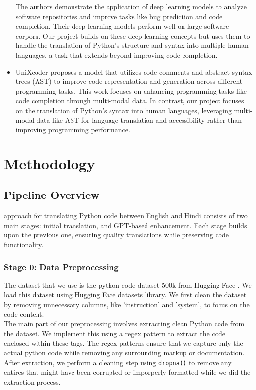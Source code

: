 \documentclass[11pt,a4paper]{article}
\begin{document}
\begin{itemize}
  The authors demonstrate the application of deep learning models to analyze software repositories and improve tasks like bug prediction and code completion. Their deep learning models perform well on large software corpora. Our project builds on these deep learning concepts but uses them to handle the translation of Python's structure and syntax into multiple human languages, a task that extends beyond improving code completion. 
  
  \item \cite{10.1109/ASE56229.2023.00076}
  
  UniXcoder proposes a model that utilizes code comments and abstract syntax trees (AST) to improve code representation and generation across different programming tasks. This work focuses on enhancing programming tasks like code completion through multi-modal data. In contrast, our project focuses on the translation of Python's syntax into human languages, leveraging multi-modal data like AST for language translation and accessibility rather than improving programming performance. 
\end{itemize}

\section {Methodology}
\subsection{Pipeline Overview}
approach for translating Python code between English and Hindi consists of two main stages: initial translation, and GPT-based enhancement. Each stage builds upon the previous one, ensuring quality translations while preserving code functionality.
\subsubsection{Stage 0: Data Preprocessing}
The dataset that we use is the python-code-dataset-500k from Hugging Face \cite{jtatman2021python}. We load this dataset using Hugging Face datasets library. We first clean the dataset by removing unnecessary columns, like 'instruction' and 'system', to focus on the code content.\\ 

The main part of our preprocessing involves extracting clean Python code from the dataset. We implement this using a regex pattern to extract the code enclosed within these tags. The regex patterns ensure that we capture only the actual python code while removing any surrounding markup or documentation. After extraction, we perform a cleaning step using \texttt{dropna()} to remove any entires that might have been corrupted or imporperly formatted while we did the extraction process.\\ 
\end{document}
